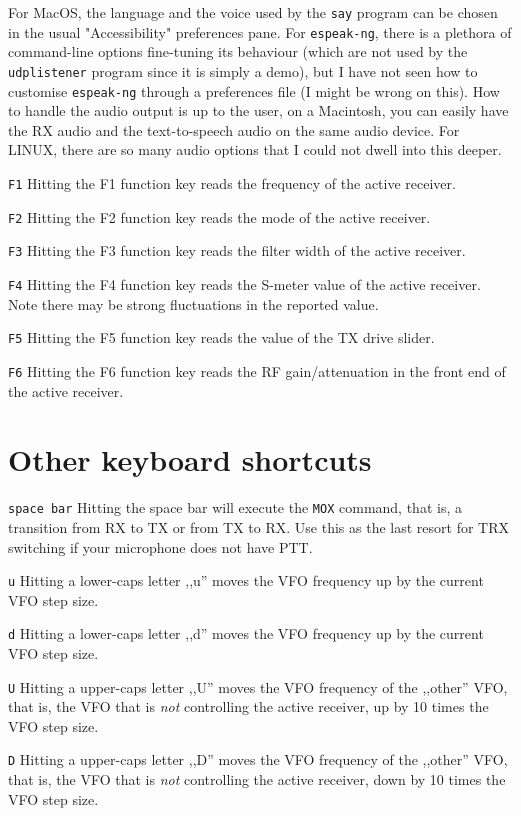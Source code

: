 \documentclass[12pt]{book}
\def\rett#1{\texttt{\color{red}#1}}
\def\bltt#1{\texttt{\color{blue}#1}}
\begin{document}
For MacOS, the language and the voice used by the \texttt{say} program can be chosen in
the usual "Accessibility" preferences pane. For \texttt{espeak-ng}, there is a plethora of
command-line options fine-tuning its behaviour (which are not used by the \texttt{udplistener}
program since it is simply a demo), but I have not seen how to customise \texttt{espeak-ng}
through a preferences file (I might be wrong on this). How to handle the audio output
is up to the user, on a Macintosh, you can easily have the RX audio and the text-to-speech
audio on the same audio device. For LINUX, there are so many audio options that I could
not dwell into this deeper.

\rett{F1} Hitting the F1 function key reads the frequency of the active receiver.

\rett{F2} Hitting the F2 function key reads the mode of the active receiver.

\rett{F3} Hitting the F3 function key reads the filter width of the active receiver.

\rett{F4} Hitting the F4 function key reads the S-meter value of the active receiver.
Note there may be strong fluctuations in the reported value.

\rett{F5} Hitting the F5 function key reads the value of the TX drive slider.

\rett{F6} Hitting the F6 function key reads the RF gain/attenuation in the front
end of the active receiver.


\section{Other keyboard shortcuts}

\rett{space bar} Hitting the space bar will execute the \bltt{MOX} command, that is, a
transition from RX to TX or from TX to RX. Use this as the last resort for TRX switching
if your microphone does not have PTT.

\rett{u} Hitting a lower-caps letter ,,u'' moves the VFO frequency up by the current VFO
step size.

\rett{d} Hitting a lower-caps letter ,,d'' moves the VFO frequency up by the current VFO
step size.

\rett{U} Hitting a upper-caps letter ,,U'' moves the VFO frequency of the ,,other'' VFO, that is,
the VFO that is \textit{not} controlling the active receiver, up by 10 times the VFO step size.

\rett{D} Hitting a upper-caps letter ,,D'' moves the VFO frequency of the ,,other'' VFO, that is,
the VFO that is \textit{not} controlling the active receiver, down by 10 times the VFO step size.
\end{document}
